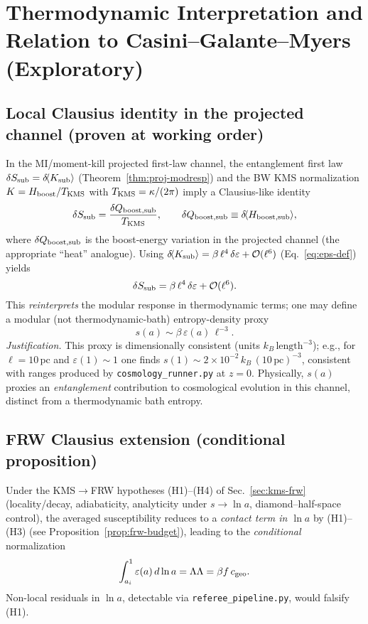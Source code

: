 \documentclass[aps,prd,onecolumn,superscriptaddress,nofootinbib]{revtex4-2}
\def\Omega_\Lambda{OmegaLambda}%
\providecommand{\be}{\begin{equation}}
\providecommand{\ee}{\end{equation}}
\begin{document}
\section{Thermodynamic Interpretation and Relation to Casini--Galante--Myers (Exploratory)}
\label{sec:thermo}

\subsection{Local Clausius identity in the projected channel (proven at working order)}
In the MI/moment-kill projected first-law channel, the entanglement first law \(\delta S_{\rm sub}=\delta\!\langle K_{\rm sub}\rangle\) (Theorem~\ref{thm:proj-modresp}) and the BW KMS normalization \(K=H_{\rm boost}/T_{\rm KMS}\) with \(T_{\rm KMS}=\kappa/(2\pi)\) imply a Clausius-like identity
\be
\delta S_{\rm sub}=\frac{\delta Q_{\rm boost,sub}}{T_{\rm KMS}}, \qquad
\delta Q_{\rm boost,sub}\equiv \delta\!\langle H_{\rm boost,sub}\rangle,
\ee
where \(\delta Q_{\rm boost,sub}\) is the boost-energy variation in the projected channel (the appropriate ``heat'' analogue). Using \(\delta\!\langle K_{\rm sub}\rangle=\beta\,\ell^4\,\delta\varepsilon+\mathcal O(\ell^6)\) (Eq.~\ref{eq:eps-def}) yields
\be
\delta S_{\rm sub}=\beta\,\ell^4\,\delta\varepsilon+\mathcal O(\ell^6).
\label{eq:clausius-response}
\ee
This \emph{reinterprets} the modular response in thermodynamic terms; one may define a modular (not thermodynamic-bath) entropy-density proxy
\[
s(a)\sim \beta\,\varepsilon(a)\,\ell^{-3}.
\]
\emph{Justification.} This proxy is dimensionally consistent (units \(k_B\,\mathrm{length}^{-3}\)); e.g., for \(\ell=10\,\mathrm{pc}\) and \(\varepsilon(1)\sim 1\) one finds \(s(1)\sim 2\times 10^{-2}\,k_B\,(10\,\mathrm{pc})^{-3}\), consistent with ranges produced by \texttt{cosmology\_runner.py} at \(z=0\). Physically, \(s(a)\) proxies an \emph{entanglement} contribution to cosmological evolution in this channel, distinct from a thermodynamic bath entropy.

\subsection{FRW Clausius extension (conditional proposition)}
Under the KMS\(\to\)FRW hypotheses (H1)–(H4) of Sec.~\ref{sec:kms-frw} (locality/decay, adiabaticity, analyticity under \(s\to\ln a\), diamond–half-space control), the averaged susceptibility reduces to a \emph{contact term in \(\ln a\)} by (H1)–(H3) (see Proposition~\ref{prop:frw-budget}), leading to the \emph{conditional} normalization
\be
\int_{a_i}^{1}\varepsilon(a)\,d\ln a=\Omega_\Lambda=\beta f\,c_{\rm geo}.
\ee
Non-local residuals in \(\ln a\), detectable via \texttt{referee\_pipeline.py}, would falsify (H1).
\end{document}
